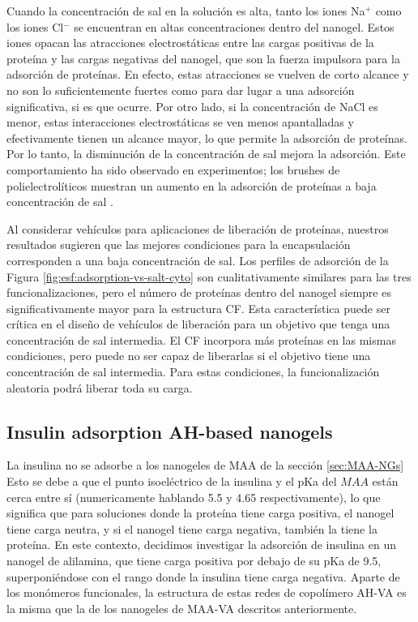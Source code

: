 Cuando la concentraci\'on de sal en la soluci\'on es alta, tanto los iones Na$^+$ como los iones Cl$^-$ se encuentran en altas concentraciones dentro del nanogel.
Estos iones opacan las atracciones electrost\'aticas entre las cargas positivas de la prote\'ina y las cargas negativas del nanogel, que son la fuerza impulsora para la adsorci\'on de prote\'inas.
En efecto, estas atracciones se vuelven de corto alcance y no son lo suficientemente fuertes como para dar lugar a una adsorci\'on significativa, si es que ocurre.
Por otro lado, si la concentraci\'on de NaCl es menor, estas interacciones electrost\'aticas se ven menos apantalladas y efectivamente tienen un alcance mayor, lo que permite la adsorci\'on de prote\'inas.
Por lo tanto, la disminuci\'on de la concentraci\'on de sal mejora la adsorci\'on.
Este comportamiento ha sido observado en experimentos; los brushes de  polielectrolíticos muestran un aumento en la adsorci\'on de prote\'inas a baja concentraci\'on de sal .

Al considerar veh\'iculos para aplicaciones de liberaci\'on de prote\'inas, nuestros resultados sugieren que las mejores condiciones para la encapsulaci\'on corresponden a una baja concentraci\'on de sal.
Los perfiles de adsorci\'on de la Figura \ref{fig:esf:adsorption-vs-salt-cyto} son cualitativamente similares para las tres funcionalizaciones, pero el n\'umero de prote\'inas dentro del nanogel siempre es significativamente mayor para la estructura CF.
Esta caracter\'istica puede ser cr\'itica en el dise\~no de veh\'iculos de liberaci\'on para un objetivo que tenga una concentraci\'on de sal intermedia.
El CF incorpora m\'as prote\'inas en las mismas condiciones, pero puede no ser capaz de liberarlas si el objetivo tiene una concentraci\'on de sal intermedia.
Para estas condiciones, la funcionalizaci\'on aleatoria podr\'a liberar toda su carga.



\subsection{Insulin adsorption AH-based nanogels} 

La insulina no se adsorbe a los nanogeles de MAA de la secci\'on \ref{sec:MAA-NGs} %
Esto se debe a que el punto isoel\'ectrico de la insulina y el pKa del $MAA$ est\'an cerca entre s\'i (numericamente hablando 5.5 y 4.65 respectivamente), lo que significa que para soluciones donde la prote\'ina tiene carga positiva, el nanogel tiene carga neutra, y si el nanogel tiene carga negativa, tambi\'en la tiene la prote\'ina.
En este contexto, decidimos investigar la adsorci\'on de insulina en un nanogel de alilamina, que tiene carga positiva por debajo de su pKa de 9.5, superponi\'endose con el rango donde la insulina tiene carga negativa.
Aparte de los mon\'omeros funcionales, la estructura de estas redes de copol\'imero AH-VA es la misma que la de los nanogeles de MAA-VA descritos anteriormente.


